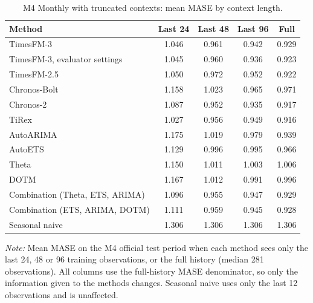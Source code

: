 \begin{table}[!htbp]
\centering
\begin{threeparttable}
\caption{M4 Monthly with truncated contexts: mean MASE by context length.}
\label{tab:truncation}
\small\setlength{\tabcolsep}{4pt}
\begin{tabular}{lcccc}
\toprule
Method & Last 24 & Last 48 & Last 96 & Full \\
\midrule
TimesFM-3 & 1.046 & 0.961 & 0.942 & 0.929 \\
TimesFM-3, evaluator settings & 1.045 & 0.960 & 0.936 & 0.923 \\
TimesFM-2.5 & 1.050 & 0.972 & 0.952 & 0.922 \\
Chronos-Bolt & 1.158 & 1.023 & 0.965 & 0.971 \\
Chronos-2 & 1.087 & 0.952 & 0.935 & 0.917 \\
TiRex & 1.027 & 0.956 & 0.949 & 0.916 \\
AutoARIMA & 1.175 & 1.019 & 0.979 & 0.939 \\
AutoETS & 1.129 & 0.996 & 0.995 & 0.966 \\
Theta & 1.150 & 1.011 & 1.003 & 1.006 \\
DOTM & 1.167 & 1.012 & 0.991 & 0.996 \\
Combination (Theta, ETS, ARIMA) & 1.096 & 0.955 & 0.947 & 0.929 \\
Combination (ETS, ARIMA, DOTM) & 1.111 & 0.959 & 0.945 & 0.928 \\
Seasonal naive & 1.306 & 1.306 & 1.306 & 1.306 \\
\bottomrule
\end{tabular}
\begin{tablenotes}[flushleft]\footnotesize
\item \textit{Note:} Mean MASE on the M4 official test period when each method sees only the last 24, 48 or 96 training observations, or the full history (median 281 observations). All columns use the full-history MASE denominator, so only the information given to the methods changes. Seasonal naive uses only the last 12 observations and is unaffected.
\end{tablenotes}
\end{threeparttable}
\end{table}
